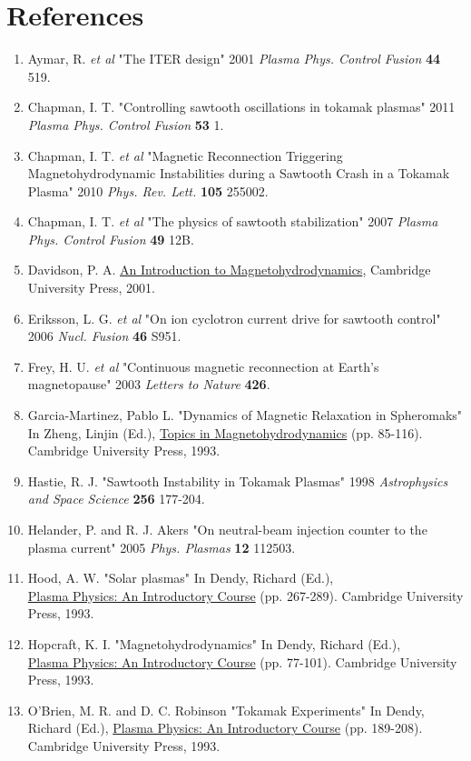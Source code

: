 \documentclass{article}
\begin{document}
\section{References}
\begin{enumerate}
\item Aymar, R. \textit{et al} "The ITER design" 2001 \textit{Plasma Phys. Control Fusion} \textbf{44} 519.
\item Chapman, I. T. "Controlling sawtooth oscillations in tokamak plasmas" 2011 \textit{Plasma Phys. Control Fusion} \textbf{53} 1.
\item Chapman, I. T. \textit{et al} "Magnetic Reconnection Triggering Magnetohydrodynamic Instabilities during a Sawtooth Crash in a Tokamak Plasma" 2010 \textit{Phys. Rev. Lett.} \textbf{105} 255002.
\item Chapman, I. T. \textit{et al} "The physics of sawtooth stabilization" 2007 \textit{Plasma Phys. Control Fusion} \textbf{49} 12B.
\item Davidson, P. A. \underline{An Introduction to Magnetohydrodynamics}, Cambridge University Press, 2001.
\item Eriksson, L. G. \textit{et al} "On ion cyclotron current drive for sawtooth control" 2006 \textit{Nucl. Fusion} \textbf{46} S951.
\item Frey, H. U. \textit{et al} "Continuous magnetic reconnection at Earth's magnetopause" 2003 \textit{Letters to Nature} \textbf{426}.
\item Garcia-Martinez, Pablo L. "Dynamics of Magnetic Relaxation in Spheromaks" In Zheng, Linjin (Ed.), \underline{Topics in Magnetohydrodynamics} (pp. 85-116). Cambridge University Press, 1993.
\item Hastie, R. J. "Sawtooth Instability in Tokamak Plasmas" 1998 \textit{Astrophysics and Space Science} \textbf{256} 177-204.
\item Helander, P. and R. J. Akers "On neutral-beam injection counter to the plasma current" 2005 \textit{Phys. Plasmas} \textbf{12} 112503.
\item Hood, A. W. "Solar plasmas" In Dendy, Richard (Ed.),\\ \underline{Plasma Physics: An Introductory Course} (pp. 267-289). Cambridge University Press, 1993.
\item Hopcraft, K. I. "Magnetohydrodynamics" In Dendy, Richard (Ed.),\\ \underline{Plasma Physics: An Introductory Course} (pp. 77-101). Cambridge University Press, 1993.
\item O'Brien, M. R. and D. C. Robinson "Tokamak Experiments" In Dendy, Richard (Ed.), \underline{Plasma Physics: An Introductory Course} (pp. 189-208). Cambridge University Press, 1993.

\end{enumerate}
\end{document}
